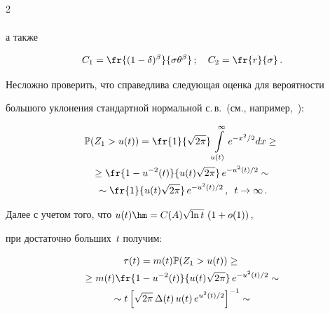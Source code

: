 \begin{multicols}{2}
\begin{multline*}
\end{multline*}


а также





\noindent


\begin{equation}


C_1=\fr{(1-\delta)^\beta}{\sigma{\theta}^\beta}\,;\quad C_2=\fr{r}{\sigma}\,.


\label{e29a-ml}


\end{equation}


Несложно проверить, что справедлива следующая оценка для вероятности


большого уклонения стандартной нормальной с.\,в.\ (см., например,~\cite{Lifshits}):





\noindent


\begin{multline*}


\mathbb{P} (Z_1 > u(t))=\fr{1}{\sqrt{2\pi}}\int\limits_{u(t)}^\infty


e^{-x^2/2}dx\geq{}\\


{}\geq \fr{1-u^{-2}(t)}{u(t)\sqrt{2\pi}}\,e^{-u^2(t)/2}\sim{}\\


{}\sim


\fr{1}{u(t)\sqrt{2\pi}}\,e^{-u^2(t)/2}\,,\enskip t \to \infty\,.


\end{multline*}


Далее с учетом того, что $u(t) \hm= C(A) \sqrt{\ln t}\,\left(1+o(1)\right)$,


при достаточно больших~$t$ получим:





\noindent


\begin{multline}


\tau(t)=m(t)\mathbb{P}(Z_1>u(t))\geq{}\\


{}\geq m(t)\fr{1-u^{-2}(t)}{u(t)\sqrt{2\pi}}\,e^{-u^2(t)/2}\sim{}\\


{}\sim t\left[\sqrt{2\pi}\,\Delta(t)\,u(t)\,e^{u^2(t)/2}\right]^{-1}\sim{}\\



\end{multline}
\end{multicols}
